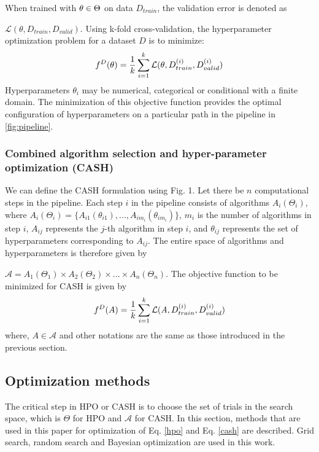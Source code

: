 When trained with $\emph{$\theta$} \in \textbf{$\Theta$}$ on data $D_{train}$, the validation error is denoted as \par
\noindent $\mathcal{L}(\theta, D_{train}, D_{valid})$. Using k-fold cross-validation, the hyperparameter optimization problem for a dataset $D$ is to minimize:
\begin{equation}
\label{hpo}
f^D(\theta) = \frac{1}{k}\sum_{i=1}^{k} \mathcal{L}(\emph{$\theta$}, D_{train}^{(i)}, D_{valid}^{(i)}) 
\end{equation}
Hyperparameters $\theta_i$ may be numerical, categorical or conditional with a finite domain. The minimization of this objective function provides the optimal configuration of hyperparameters on a particular path in the pipeline in \ref{fig:pipeline}.

\subsubsection{Combined algorithm selection and hyper-parameter optimization (CASH)}
\label{subsubsec_CASH}
We can define the CASH formulation using Fig. 1. Let there be $n$ computational steps in the pipeline. Each step $i$ in the pipeline consists of algorithms $A_i(\Theta_i)$, where $A_i(\Theta_i) = \{A_{i1}(\theta_{i1}), ..., A_{im_{i}}(\theta_{im_{i}})\}$, $m_{i}$ is the number of algorithms in step $i$, $A_{ij}$ represents the $j$-th algorithm in step $i$, and \textbf{$\theta_{ij}$} represents the set of hyperparameters corresponding to  $A_{ij}$. The entire space of algorithms and hyperparameters is therefore given by \par
\noindent $\mathcal{A} = A_1(\Theta_1) \times A_2(\Theta_2) \times ... \times A_n(\Theta_n)$. The objective function to be minimized for CASH is given by
\begin{equation}
\label{cash}
f^D(A) = \frac{1}{k}\sum_{i=1}^{k} \mathcal{L}(\emph{A}, D_{train}^{(i)}, D_{valid}^{(i)}) 
\end{equation}
where, $A \in \mathcal{A}$ and other notations are the same as those introduced in the previous section.

\subsection{Optimization methods}
The critical step in HPO or CASH is to choose the set of trials in the search space, which is $\Theta$ for HPO and $\mathcal{A}$ for CASH. In this section, methods that are used in this paper for optimization of Eq. \ref{hpo} and Eq. \ref{cash} are described. Grid search, random search and Bayesian optimization are used in this work.
